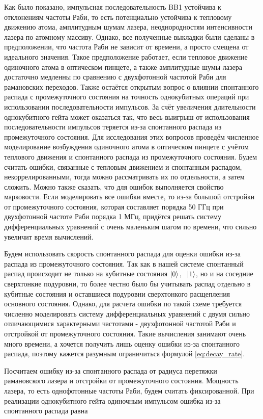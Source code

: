 Как было показано, импульсная последовательность BB1 устойчива к отклонениям частоты Раби, то есть потенциально устойчива к тепловому движению атома, амплитудным шумам лазера, неоднородностям интенсивности лазера по атомному массиву. Однако, все полученные выкладки были сделаны в предположении, что частота Раби не зависит от времени, а просто смещена от идеального значения. Такое предположение работает, если тепловое движение одиночного атома в оптическом пинцете, а также амплитудные шумы лазера достаточно медленны по сравнению с двухфотонной частотой Раби для рамановских переходов. 
Также остаётся открытым вопрос о влиянии спонтанного распада с промежуточного состояния на точность однокубитных операций при использовании последовательности импульсов. За счёт увеличения длительности однокубитного гейта может оказаться так, что весь выигрыш от использования последовательности импульсов теряется из-за спонтанного распада из промежуточного состояния. Для исследования этих вопросов проведём численное моделирование возбуждения одиночного атома в оптическом пинцете с учётом теплового движения и спонтанного распада из промежуточного состояния. 
Будем считать ошибки, связанные с тепловым движением и спонтанным распадом, некоррелированными, тогда можно рассматривать их по отдельности, а затем сложить. Можно также сказать, что для ошибок выполняется свойство марковости. Если моделировать все ошибки вместе, то из-за большой отстройки от промежуточного состояния, которая составляет порядка 50 ГГц при двухфотонной частоте Раби порядка 1 МГц, придётся решать систему дифференциальных уравнений с очень маленьким шагом по времени, что сильно увеличит время вычислений.  


Будем использовать скорость спонтанного распада для оценки ошибки из-за распада из промежуточного состояния. Так как в нашей системе спонтанный распад происходит не только на кубитные состояния $\left| 0 \right\rangle,\;\ \left| 1 \right\rangle$, но и на соседние сверхтонкие подуровни, то более честно было бы учитывать распад отдельно в кубитные состояния и оставшиеся подуровни сверхтонкого расщепления основного состояния. Однако, для расчета ошибки по такой схеме требуется численно моделировать систему дифференциальных уравнений с двумя сильно отличающимися характерными частотами - двухфотонной частотой Раби и отстройкой от промежуточного состояния. Такие вычисления занимают очень много времени, а хочется получить лишь оценку ошибки из-за спонтанного распада, поэтому кажется разумным ограничиться формулой \ref{eq:decay_rate}.

Посчитаем ошибку из-за спонтанного распада от радиуса перетяжки рамановского лазера и отстройки от промежуточного состояния. Мощность лазера, то есть однофотонные частоты Раби, будем считать фиксированной. При реализации однокубитного гейта одиночным импульсом ошибка из-за спонтанного распада равна 


